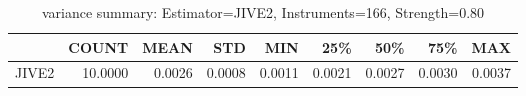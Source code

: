 \begin{table}[ht]
\centering
\caption{variance summary: Estimator=JIVE2, Instruments=166, Strength=0.80}
\begin{tabular}{lrrrrrrrr}
\toprule
 & COUNT & MEAN & STD & MIN & 25\% & 50\% & 75\% & MAX \\
\midrule
JIVE2 & 10.0000 & 0.0026 & 0.0008 & 0.0011 & 0.0021 & 0.0027 & 0.0030 & 0.0037 \\
\bottomrule
\end{tabular}
\end{table}
